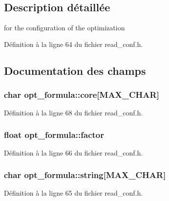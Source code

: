 \subsection{Description détaillée}
for the configuration of the optimization 

Définition à la ligne 64 du fichier read\+\_\+conf.\+h.



\subsection{Documentation des champs}
\hypertarget{structopt__formula_a3402a90a45675c67bb00037812216906}{
\subsubsection[{core}]{\setlength{\rightskip}{0pt plus 5cm}char opt\+\_\+formula\+::core\mbox{[}{\bf M\+A\+X\+\_\+\+C\+H\+A\+R}\mbox{]}}}\label{structopt__formula_a3402a90a45675c67bb00037812216906}


Définition à la ligne 68 du fichier read\+\_\+conf.\+h.

\hypertarget{structopt__formula_ad605fd58d412c3f432e712901c48fb63}{
\subsubsection[{factor}]{\setlength{\rightskip}{0pt plus 5cm}float opt\+\_\+formula\+::factor}}\label{structopt__formula_ad605fd58d412c3f432e712901c48fb63}


Définition à la ligne 66 du fichier read\+\_\+conf.\+h.

\hypertarget{structopt__formula_a6b5a48d9fd86a6c9d7eb08e2218c382d}{
\subsubsection[{string}]{\setlength{\rightskip}{0pt plus 5cm}char opt\+\_\+formula\+::string\mbox{[}{\bf M\+A\+X\+\_\+\+C\+H\+A\+R}\mbox{]}}}\label{structopt__formula_a6b5a48d9fd86a6c9d7eb08e2218c382d}


Définition à la ligne 65 du fichier read\+\_\+conf.\+h.


